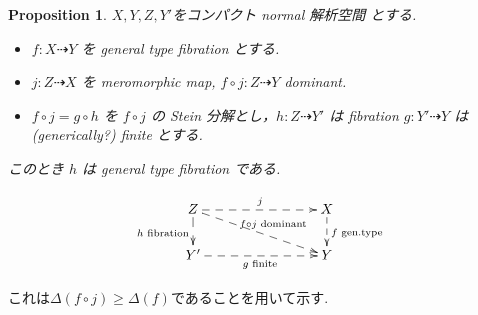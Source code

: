 \documentclass[dvipdfmx,a4paper,11pt]{article} %
\newtheorem{thm}{Theorem}[section]
\newtheorem{prop}[thm]{Proposition}
\theoremstyle{definition}
\theoremstyle{remark}
\numberwithin{equation}{section}
\begin{document}
 \begin{prop}\cite[Proposition 2.10]{Cam04}
 $X, Y, Z, Y'$をコンパクト normal 解析空間 とする. 
 \label{prop-Cam04-2.10}
 \begin{itemize}
 \item \(f : X \dashrightarrow Y\) を general type fibration とする.
 \item \(j : Z \dashrightarrow X\) を meromorphic map, \(f\circ j : Z \dashrightarrow Y\) dominant.
 \item \(f\circ j = g \circ h\) を \(f\circ j\) の Stein 分解とし，\(h : Z \dashrightarrow Y'\) は fibration \(g : Y' \dashrightarrow Y\) は(generically?) finite とする.
 \end{itemize}

このとき \(h\) は general type fibration である.

\[
\xymatrix@C=80pt@R=20pt{
Z \ar@{-->}[rd]^{f \circ j \text{ dominant}} \ar@{-->}[r]^{j}   \ar@{-->}[d]_{h \text{ fibration}} & X \ar@{-->}[d]^{f \text{ gen.type}} \\
Y' \ar@{-->}[r]_{g \text{ finite}} & Y
}
\]
\end{prop}
これは$\Delta(f \circ j) \ge \Delta(f)$であることを用いて示す. 

\end{document}
